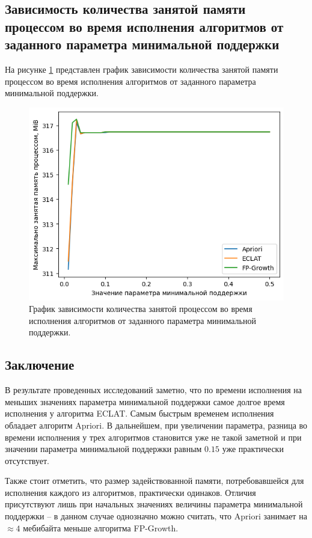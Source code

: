 \subsection{Зависимость количества занятой памяти процессом во время исполнения алгоритмов от заданного параметра минимальной поддержки}

На рисунке \ref{img:memory} представлен график зависимости количества занятой памяти процессом во время исполнения алгоритмов от заданного параметра минимальной поддержки.


\begin{figure}[H]
	\centering
	\includegraphics[width=\textwidth]{inc/memory.png}
	\caption{ График зависимости количества занятой процессом во время исполнения алгоритмов от заданного параметра минимальной поддержки.}
	\label{img:memory}
\end{figure}

\subsection*{Заключение}

В результате проведенных исследований заметно, что по времени исполнения на меньших значениях параметра минимальной поддержки самое долгое время исполнения у алгоритма ECLAT. Самым быстрым временем исполнения обладает алгоритм Apriori. В дальнейшем, при увеличении параметра, разница во времени исполнения у трех алгоритмов становится уже не такой заметной и при значении параметра минимальной поддержки равным $0.15$ уже практически отсутствует.

Также стоит отметить, что размер задействованной памяти, потребовавшейся для исполнения каждого из алгоритмов, практически одинаков. Отличия присутствуют лишь при начальных значениях величины параметра минимальной поддержки -- в данном случае однозначно можно считать, что Apriori занимает на $\approx 4$ мебибайта меньше алгоритма FP-Growth.